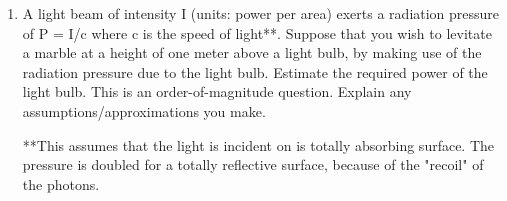 \documentclass[fleqn]{article}
\begin{document}
\begin{enumerate}
    \item A light beam of intensity I (units: power per area) exerts a radiation pressure of P = I/c where c is the speed of light**.  Suppose that you wish to levitate a marble at a height of one meter above a light bulb, by making use of the radiation pressure due to the light bulb.  Estimate the required power of the light bulb.  This is an order-of-magnitude question.  Explain any assumptions/approximations you make. 
    
    **This assumes that the light is incident on is totally absorbing surface.  The pressure is doubled for a totally reflective surface, because of the "recoil" of the photons.
    
  \end{enumerate}
\end{document}
